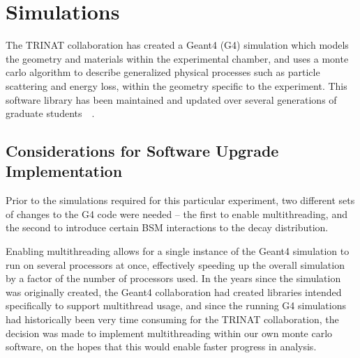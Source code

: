 % 
% 
% 
% 
\chapter{Simulations}
\label{simulations_chapter}


The TRINAT collaboration has created a Geant4 (G4) simulation which models the geometry and materials within the experimental chamber, and uses a monte carlo algorithm to describe generalized physical processes such as particle scattering and energy loss, within the geometry specific to the experiment.  This software library has been maintained and updated over several generations of graduate students~\cite{ben_thesis}~\cite{spencer_thesis}.  

\section{Considerations for Software Upgrade Implementation}
\label{sec:software_upgrades}
Prior to the simulations required for this particular experiment, two different sets of changes to the G4 code were needed -- the first to enable multithreading, and the second to introduce certain BSM interactions to the decay distribution.  

Enabling multithreading allows for a single instance of the Geant4 simulation to run on several processors at once, effectively speeding up the overall simulation by a factor of the number of processors used.  In the years since the simulation was originally created, the Geant4 collaboration had created libraries intended specifically to support multithread usage, and since the running G4 simulations had historically been very time consuming for the TRINAT collaboration, the decision was made to implement multithreading within our own monte carlo software, on the hopes that this would enable faster progress in analysis. 

